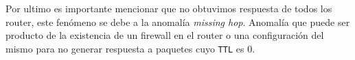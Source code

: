 Por ultimo es importante mencionar que no obtuvimos respuesta de todos los router, este fenómeno se debe a la anomalía \textit{missing hop}. Anomalía que puede ser producto de la existencia de un firewall en el router o una configuración del mismo para no generar respuesta a paquetes cuyo \texttt{TTL} es 0.
